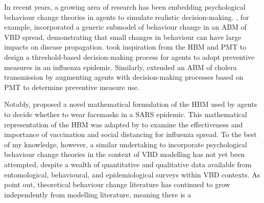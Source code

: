 
In recent years, a growing area of research has been embedding psychological behaviour change theories in agents to simulate realistic decision-making. \citet{scheidegger_agent-based_2017}, for example, incorporated a generic submodel of behaviour change in an ABM of VBD spread, demonstrating that small changes in behaviour can have large impacts on disease propagation. \citet{barbrook-johnson_uses_2017} took inspiration from the HBM and PMT to design a threshold-based decision-making process for agents to adopt preventive measures in an influenza epidemic. Similarly, \citet{abdulkareem_intelligent_2018} \cite{abdulkareem_risk_2020} extended an ABM of cholera transmission by augmenting agents with decision-making processes based on PMT to determine preventive measure use.

Notably, \citet{durham_incorporating_2012} proposed a novel mathematical formulation of the HBM used by agents to decide whether to wear facemasks in a SARS epidemic. This mathematical representation of the HBM was adapted by \citet{karimi_effect_2015} to examine the effectiveness and importance of vaccination and social distancing for influenza spread. To the best of my knowledge, however, a similar undertaking to incorporate psychological behaviour change theories in the context of VBD modelling has not yet been attempted, despite a wealth of quantitative and qualitative data available from entomological, behavioural, and epidemiological surveys within VBD contexts. As \citet{weston_infection_2018} point out, theoretical behaviour change literature has continued to grow independently from modelling literature, meaning there is a  \\


